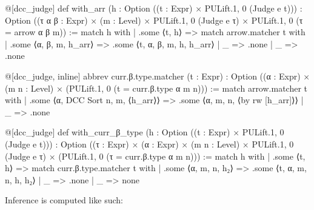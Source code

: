 \documentclass{article}
\begin{document}
\begin{leancode}
@[dcc_judge] def with_arr (h : Option ((t : Expr) × PULift.{1, 0} (Judge e t))) :
  Option ((τ α β : Expr) × (m : Level) × PULift.{1, 0} (Judge e τ) × PULift.{1, 0} (τ = arrow α β m)) :=
    match h with
    | .some ⟨t, h⟩ => match arrow.matcher t with
      | .some ⟨α, β, m, h_arr⟩ => .some ⟨t, α, β, m, h, h_arr⟩
      | _ => .none
    | _ => .none

@[dcc_judge, inline] abbrev curr.β.type.matcher (t : Expr) : Option
  ((α : Expr) × (m n : Level) × (PULift.{1, 0} (t = curr.β.type α m n))) :=
  match arrow.matcher t with
  | .some ⟨α, DCC Sort n, m, ⟨h_arr⟩⟩ =>
    .some ⟨α, m, n, ⟨by rw [h_arr]⟩⟩
  | _ => .none

@[dcc_judge] def with_curr_β_type (h : Option ((t : Expr) × PULift.{1, 0} (Judge e t))) :
  Option ((τ : Expr) × (α : Expr) × (m n : Level) × PULift.{1, 0} (Judge e τ) × (PULift.{1, 0} (τ = curr.β.type α m n))) :=
  match h with
  | .some ⟨t, h⟩ => match curr.β.type.matcher t with
    | .some ⟨α, m, n, h₂⟩ => .some ⟨t, α, m, n, h, h₂⟩
    | _ => .none
  | _ => none
\end{leancode}

Inference is computed like such:
\end{document}
